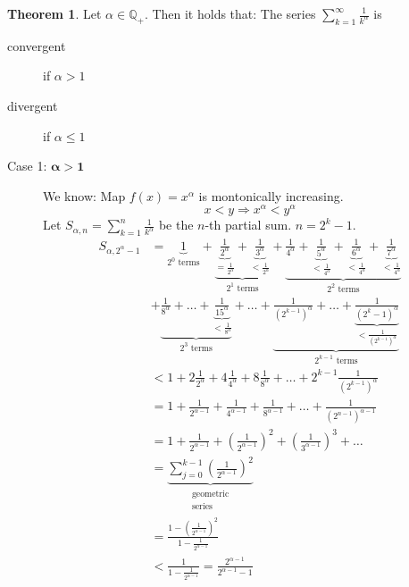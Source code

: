 \documentclass[a4paper,landscape,twocolumn]{article}
\theoremstyle{definition}
\newtheorem{theorem}{Theorem}
\begin{document}
\begin{theorem}
  Let $\alpha \in \mathbb Q_+$. Then it holds that: The series $\sum_{k=1}^\infty \frac{1}{k^\alpha}$ is
  \begin{description}
    \item[convergent] if $\alpha > 1$
    \item[divergent] if $\alpha \leq 1$
  \end{description}
\end{theorem}
\begin{description}
  \item[Case 1: $\mathbf{\alpha > 1}$]
    We know: Map $f(x) = x^\alpha$ is montonically increasing.
    \[ x < y \Rightarrow x^\alpha < y^\alpha \]
    Let $S_{\alpha,n} = \sum_{k=1}^n \frac{1}{k^\alpha}$ be the $n$-th partial sum.
    $n = 2^k - 1$.
    \begin{align*}
      S_{\alpha,2^\alpha-1} &=
        \underbrace{1}_{2^0 \text{ terms}} +
        \underbrace{\underbrace{\frac1{2^\alpha}}_{= \frac1{2^\alpha}} + \underbrace{\frac{1}{3^\alpha}}_{< \frac1{2^\alpha}}}_{2^1 \text{ terms}} +
        \underbrace{\frac{1}{4^\alpha} + \underbrace{\frac{1}{5^\alpha}}_{< \frac1{4^\alpha}} + \underbrace{\frac{1}{6^\alpha}}_{< \frac1{4^\alpha}} + \underbrace{\frac{1}{7^\alpha}}_{< \frac1{4^\alpha}}}_{2^2 \text{ terms}} \\
      &+
        \underbrace{\frac1{8^\alpha} + \ldots + \underbrace{\frac{1}{15^\alpha}}_{< \frac1{8^\alpha}}}_{2^3 \text{ terms}}
        + \ldots +
        \underbrace{\frac{1}{\left(2^{k-1}\right)^\alpha} + \ldots + \underbrace{\frac{1}{\left(2^k - 1\right)^\alpha}}_{< \frac1{\left(2^{k-1}\right)^\alpha}}}_{2^{k-1} \text{ terms}} \\
      &< 1 + 2 \frac{1}{2^\alpha} + 4 \frac{1}{4^\alpha} + 8 \frac{1}{8^\alpha} + \dots + 2^{k-1} \frac{1}{\left(2^{k-1}\right)^\alpha} \\
      &= 1 + \frac{1}{2^{\alpha-1}} + \frac{1}{4^{\alpha-1}} + \frac{1}{8^{\alpha-1}} + \dots + \frac{1}{\left(2^{n-1}\right)^{\alpha-1}} \\
      &= 1 + \frac{1}{2^{\alpha-1}} + \left(\frac{1}{2^{\alpha-1}}\right)^2 + \left(\frac{1}{3^{\alpha-1}}\right)^3 + \dots \\
      &= \underbrace{\sum_{j=0}^{k-1} \left(\frac{1}{2^{\alpha-1}}\right)^2}_{\substack{\text{geometric} \\ \text{series}}} \\
      &= \frac{1 - \left(\frac{1}{2^{\alpha-1}}\right)^2}{1 - \frac1{2^{\alpha-1}}} \\
      &< \frac{1}{1 - \frac{1}{2^{\alpha - 1}}} = \frac{2^{\alpha - 1}}{2^{\alpha - 1} - 1}
    \end{align*}


\end{description}
\end{document}
